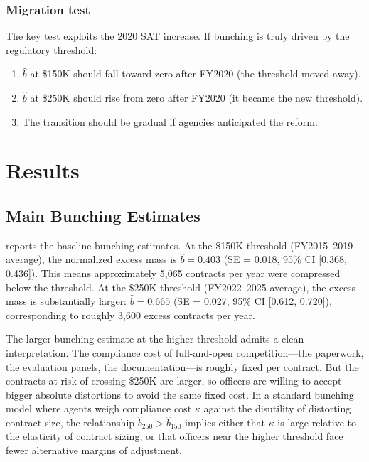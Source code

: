 \documentclass[12pt]{article}
\begin{document}
\subsubsection*{Migration test} The key test exploits the 2020 SAT increase. If bunching is truly driven by the regulatory threshold:
\begin{enumerate}
\item $\hat{b}$ at \$150K should fall toward zero after FY2020 (the threshold moved away).
\item $\hat{b}$ at \$250K should rise from zero after FY2020 (it became the new threshold).
\item The transition should be gradual if agencies anticipated the reform.
\end{enumerate}

\section{Results}

\subsection{Main Bunching Estimates}

 reports the baseline bunching estimates. At the \$150K threshold (FY2015--2019 average), the normalized excess mass is $\hat{b} = 0.403$ (SE = 0.018, 95\% CI [0.368, 0.436]). This means approximately 5,065 contracts per year were compressed below the threshold. At the \$250K threshold (FY2022--2025 average), the excess mass is substantially larger: $\hat{b} = 0.665$ (SE = 0.027, 95\% CI [0.612, 0.720]), corresponding to roughly 3,600 excess contracts per year.



The larger bunching estimate at the higher threshold admits a clean interpretation. The compliance cost of full-and-open competition---the paperwork, the evaluation panels, the documentation---is roughly fixed per contract. But the contracts at risk of crossing \$250K are larger, so officers are willing to accept bigger absolute distortions to avoid the same fixed cost. In a standard bunching model where agents weigh compliance cost $\kappa$ against the disutility of distorting contract size, the relationship $\hat{b}_{250} > \hat{b}_{150}$ implies either that $\kappa$ is large relative to the elasticity of contract sizing, or that officers near the higher threshold face fewer alternative margins of adjustment.
\end{document}
